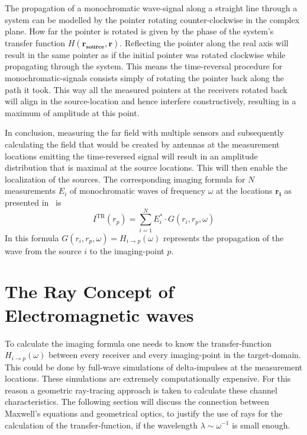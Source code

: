 The propagation of a monochromatic wave-signal along a straight line through a system can be modelled by the pointer rotating counter-clockwise in the complex plane.
How far the pointer is rotated is given by the phase of the system's transfer function \(H(\mathbf{r_{source}}, \mathbf{r})\).
Reflecting the pointer along the real axis will result in the same pointer as if the initial pointer was rotated clockwise while propagating through the system.
This means the time-reversal procedure for monochromatic-signals consists simply of rotating the pointer back along the path it took.
This way all the measured pointers at the receivers rotated back will align in the source-location and hence interfere constructively, resulting in a maximum of amplitude at this point.  

\vspace{1cm}
In conclusion, measuring the far field with multiple sensors and subsequently calculating the field that would be created by antennas at the measurement locations emitting the time-reversed signal will result in an amplitude distribution that is maximal at the source locations.
This will then enable the localization of the sources. 
The corresponding imaging formula for \(N\) measurements \(E_i\) of monochromatic waves of frequency \(\omega \) at the locations \(\mathbf{r_i}\) as presented in~\parencite{peng_zhang_comparison_2013} is
\begin{equation}
    I^{\mathrm{TR}}\left(r_p\right)=\sum_{i=1}^N E_{i}^* \cdot G\left(r_i, r_p, \omega\right)
\end{equation}
In this formula \(G(r_i, r_p, \omega) = H_{i\rightarrow p}(\omega)\) represents the propagation of the wave from the source \(i\) to the imaging-point \(p\).



\section{The Ray Concept of Electromagnetic waves}
To calculate the imaging formula one needs to know the transfer-function \(H_{i\rightarrow p}(\omega)\) between every receiver and every imaging-point in the target-domain.
This could be done by full-wave simulations of delta-impulses at the measurement locations.
These simulations are extremely computationally expensive.
For this reason a geometric ray-tracing approach is taken to calculate these channel characteristics.
The following section will discuss the connection between Maxwell's equations and geometrical optics, to justify the use of rays for the calculation of the transfer-function, if the wavelength \(\lambda \sim \omega^{-1} \) is small enough.

